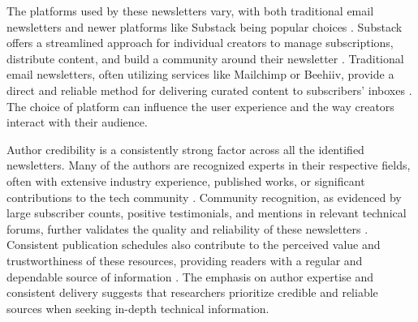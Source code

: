 \documentclass[11pt]{article}
\begin{document}
The platforms used by these newsletters vary, with both traditional email newsletters and newer platforms like Substack being popular choices \citep{orosz2025jellypod}. Substack offers a streamlined approach for individual creators to manage subscriptions, distribute content, and build a community around their newsletter \citep{growthinreverse2025gergely}. Traditional email newsletters, often utilizing services like Mailchimp or Beehiiv, provide a direct and reliable method for delivering curated content to subscribers' inboxes \citep{hackernewsletter2025}. The choice of platform can influence the user experience and the way creators interact with their audience.

Author credibility is a consistently strong factor across all the identified newsletters. Many of the authors are recognized experts in their respective fields, often with extensive industry experience, published works, or significant contributions to the tech community \citep{favikon2025orosz}. Community recognition, as evidenced by large subscriber counts, positive testimonials, and mentions in relevant technical forums, further validates the quality and reliability of these newsletters \citep{shoutout2025orosz}. Consistent publication schedules also contribute to the perceived value and trustworthiness of these resources, providing readers with a regular and dependable source of information \citep{shekhar2025distributedsystems}. The emphasis on author expertise and consistent delivery suggests that researchers prioritize credible and reliable sources when seeking in-depth technical information.
\end{document}
